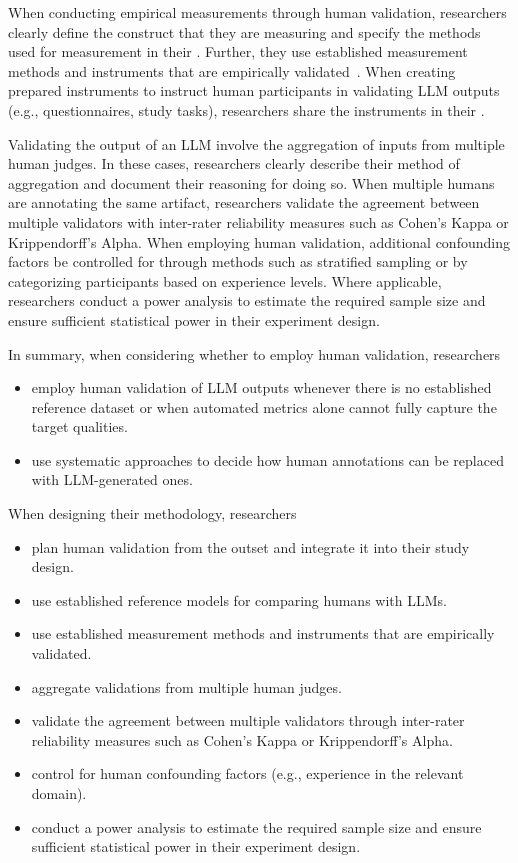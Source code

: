 When conducting empirical measurements through human validation, researchers \must clearly define the construct that they are measuring and \must specify the methods used for measurement in their \paper.
Further, they \should use established measurement methods and instruments that are empirically validated~\cite{DBLP:journals/fcomp/HoffmanMKL23, DBLP:conf/chi/PerrigSB23}.
When creating prepared instruments to instruct human participants in validating LLM outputs (e.g., questionnaires, study tasks), researchers \should share the instruments in their \supplementarymaterial.

Validating the output of an LLM \may involve the aggregation of inputs from multiple human judges.
In these cases, researchers \should clearly describe their method of aggregation and document their reasoning for doing so.
When multiple humans are annotating the same artifact, researchers \should validate the agreement between multiple validators with inter-rater reliability measures such as Cohen's Kappa or Krippendorff's Alpha.
When employing human validation, additional confounding factors \should be controlled for through methods such as stratified sampling or by categorizing participants based on experience levels.
Where applicable, researchers \should conduct a power analysis to estimate the required sample size and ensure sufficient statistical power in their experiment design.

In summary, when considering whether to employ human validation, researchers
\begin{itemize}
    \item \must employ human validation of LLM outputs whenever there is no established reference dataset or when automated metrics alone cannot fully capture the target qualities.
    \item \should use systematic approaches to decide how human annotations can be replaced with LLM-generated ones.
\end{itemize}

When designing their methodology, researchers
\begin{itemize}
    \item \should plan human validation from the outset and integrate it into their study design.
    \item \should use established reference models for comparing humans with LLMs.
    \item \should use established measurement methods and instruments that are empirically validated.
    \item \may aggregate validations from multiple human judges.
    \item \should validate the agreement between multiple validators through inter-rater reliability measures such as Cohen's Kappa or Krippendorff's Alpha.
    \item \should control for human confounding factors (e.g., experience in the relevant domain). 
    \item \should conduct a power analysis to estimate the required sample size and ensure sufficient statistical power in their experiment design.
\end{itemize}

